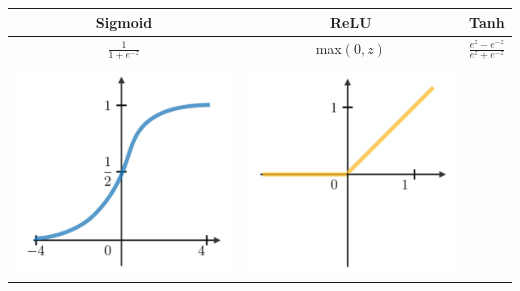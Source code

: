 \documentclass[letterpaper, 10.5pt,landscape]{article}
\begin{document}
\begin{multicols*}{3}
\vspace{-1mm}
\begin{center}
\begin{tabular}{c|c|c}
          Sigmoid & ReLU & Tanh\\
         \hline
         \rule{0pt}{3ex}
         $\frac{1}{1+e^{-z}} $  & max$(0,z)$ & $\frac{e^z - e^{-z}}{e^z + e^{-z}}$\\
           &   &  \vspace{-2mm}\\

         \hline
         \includegraphics[scale = .047]{figures/sigmoid1.JPG} &
         \includegraphics[scale = .047]{figures/relu.JPG} &

\end{tabular}
\end{center}
\end{multicols*}
\end{document}

